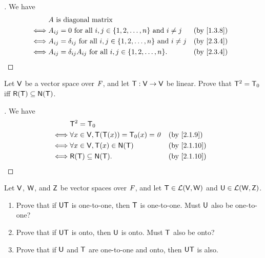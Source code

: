 \begin{proof}[]
  We have
  \begin{align*}
         & A \text{ is diagonal matrix}                                                                                \\
    \iff & A_{i j} = 0 \text{ for all } i, j \in \set{1, 2, \dots, n} \text{ and } i \neq j            &  & \by{1.3.8} \\
    \iff & A_{i j} = \delta_{i j} \text{ for all } i, j \in \set{1, 2, \dots, n} \text{ and } i \neq j &  & \by{2.3.4} \\
    \iff & A_{i j} = \delta_{i j} A_{i j} \text{ for all } i, j \in \set{1, 2, \dots, n}.              &  & \by{2.3.4}
  \end{align*}
\end{proof}

\begin{ex}\label{ex:2.3.11}
  Let \(\mathsf{V}\) be a vector space over \(\mathit{F}\), and let \(\mathsf{T} : \mathsf{V} \to \mathsf{V}\) be linear.
  Prove that \(\mathsf{T}^2 = \mathsf{T}_0\) iff \(\rg{\T} \subseteq \ns{\T}\).
\end{ex}

\begin{proof}[]
  We have
  \begin{align*}
         & \T^2 = \zT                                                  \\
    \iff & \forall x \in \V, \T(\T(x)) = \zT(x) = \zv &  & \by{2.1.9}  \\
    \iff & \forall x \in \V, \T(x) \in \ns{\T}        &  & \by{2.1.10} \\
    \iff & \rg{\T} \subseteq \ns{\T}.                 &  & \by{2.1.10}
  \end{align*}
\end{proof}

\begin{ex}\label{ex:2.3.12}
  Let \(\mathsf{V}\), \(\mathsf{W}\), and \(\mathsf{Z}\) be vector spaces over \(\mathit{F}\), and let \(\mathsf{T} \in \mathcal{L}(\mathsf{V}, \mathsf{W})\) and \(\mathsf{U} \in \mathcal{L}(\mathsf{W}, \mathsf{Z})\).
  \begin{enumerate}
    \item Prove that if \(\mathsf{U} \mathsf{T}\) is one-to-one, then \(\mathsf{T}\) is one-to-one.
          Must \(\mathsf{U}\) also be one-to-one?
    \item Prove that if \(\mathsf{U} \mathsf{T}\) is onto, then \(\mathsf{U}\) is onto.
          Must \(\mathsf{T}\) also be onto?
    \item Prove that if \(\mathsf{U}\) and \(\mathsf{T}\) are one-to-one and onto, then \(\mathsf{U} \mathsf{T}\) is also.
  \end{enumerate}
\end{ex}

